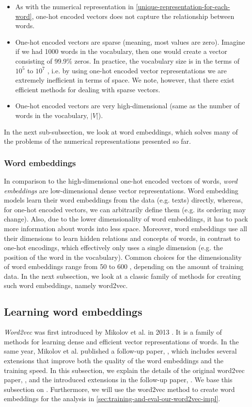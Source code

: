 \begin{itemize}
    \item As with the numerical representation in \cref{unique-representation-for-each-word}, one-hot encoded vectors does not capture the relationship between words.
    \item One-hot encoded vectors are sparse (meaning, most values are zero). Imagine if we had 1000 words in the vocabulary, then one would create a vector consisting of 99.9\% zeros. In practice, the vocabulary size is in the terms of $10^5$ to $10^7$ \cite{mikolov2013b}, i.e. by using one-hot encoded vector representations we are extremely inefficient in terms of space. We note, however, that there exist efficient methods for dealing with sparse vectors.
    \item One-hot encoded vectors are very high-dimensional (same as the number of words in the vocabulary, $|V|$).
\end{itemize}
In the next sub-subsection, we look at word embeddings, which solves many of the problems of the numerical representations presented so far.

\subsubsection{Word embeddings}
In comparison to the high-dimensional one-hot encoded vectors of words, \textit{word embeddings} are low-dimensional dense vector representations. Word embedding models learn their word embeddings from the data (e.g. texts) directly, whereas, for one-hot encoded vectors, we can arbitrarily define them (e.g. its ordering may change). Also, due to the lower dimensionality of word embeddings, it has to pack more information about words into less space. Moreover, word embeddings use all their dimensions to learn hidden relations and concepts of words, in contrast to one-hot encodings, which effectively only uses a single dimension (e.g. the position of the word in the vocabulary). Common choices for the dimensionality of word embeddings range from 50 to 600 \cite{mikolov2013a}, depending on the amount of training data. In the next subsection, we look at a classic family of methods for creating such word embeddings, namely word2vec.

\subsection{Learning word embeddings}
\label{sec:word2vec}
\textit{Word2vec} was first introduced by Mikolov et al. in 2013 \cite{mikolov2013a}. It is a family of methods for learning dense and efficient vector representations of words. In the same year, Mikolov et al. published a follow-up paper, \cite{mikolov2013b}, which includes several extensions that improve both the quality of the word embeddings and the training speed. In this subsection, we explain the details of the original word2vec paper, \cite{mikolov2013a}, and the introduced extensions in the follow-up paper, \cite{mikolov2013b}. We base this subsection on \cites{mikolov2013a}{mikolov2013b}. Furthermore, we will use the word2vec method to create word embeddings for the analysis in \cref{sec:training-and-eval-our-word2vec-impl}.

